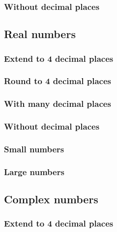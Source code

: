 \subsubsection{Without decimal places}

\subsection{Real numbers}

\subsubsection{Extend to 4 decimal places}

\subsubsection{Round to 4 decimal places}

\subsubsection{With many decimal places}

\subsubsection{Without decimal places}

\subsubsection{Small numbers}

\subsubsection{Large numbers}

\subsection{Complex numbers}

\subsubsection{Extend to 4 decimal places}

